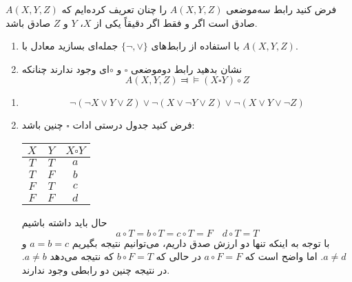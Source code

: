 فرض کنید رابط سه‌موضعی $A(X,Y,Z)$ را چنان تعریف کرده‌ایم که $A(X,Y,Z)$ صادق است اگر و فقط اگر دقیقاً یکی از $X$، $Y$ و $Z$ صادق باشد.

\begin{enumerate}
\item
با استفاده از رابط‌های
$\{\neg,\vee\}$
جمله‌ای بسازید معادل با
$A(X,Y,Z)$.
\item
نشان بدهید رابط دوموضعی $\square$ و $\circ$ای وجود ندارند چنانکه
$$
A(X,Y,Z)\Dashv\vDash(X\square Y)\circ Z
$$
\end{enumerate}\quad
\begin{ans}
\begin{enumerate}
\item
$$
\neg(\neg X\vee Y\vee Z)\vee\neg(X\vee\neg Y\vee Z)\vee\neg(X\vee Y\vee\neg Z)
$$
\item
فرض کنید جدول درستی ادات
$\square$
چنین باشد:

\begin{tabular}{c|c|c}
$X$ & $Y$ & $X\square Y$ \\
\hline
$T$ & $T$ & $a$ \\
$T$ & $F$ & $b$ \\
$F$ & $T$ & $c$ \\
$F$ & $F$ & $d$ \\
\end{tabular}

حال باید داشته باشیم
$$
a\circ T = b\circ T = c\circ T = F \quad d\circ T = T
$$
با توجه به اینکه تنها دو ارزش صدق داریم، می‌توانیم نتیجه بگیریم
$a=b=c$
و
$a\neq d$.
اما واضح است که
$a\circ F=F$
در حالی که
$b\circ F=T$
که نتیجه می‌دهد
$a\neq b$.
در نتیجه چنین دو رابطی وجود ندارند.

\end{enumerate}
\end{ans}